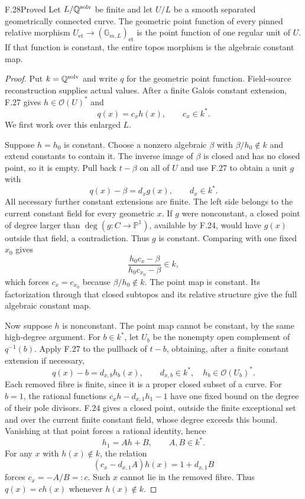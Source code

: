 \begin{claim}{F.28}{Proved}
Let $L/\mathbb Q^{\mathrm{solv}}$ be finite and let $U/L$ be a smooth
separated geometrically connected curve. The geometric point
function of every pinned relative morphism
$U_{\mathrm{et}}\to(\mathbb G_{m,L})_{\mathrm{et}}$ is the
point function of one regular unit of $U$. If that function is
constant, the entire topos morphism is the algebraic constant
map.
\end{claim}
\begin{proof}
Put $k=\mathbb Q^{\mathrm{solv}}$ and write $q$ for the geometric
point function. Field-source reconstruction supplies actual
values. After a finite Galois constant extension, F.27 gives
$h\in\mathcal O(U)^*$ and
\[
 q(x)=c_x h(x),\qquad c_x\in k^*.
\]
We first work over this enlarged $L$.

Suppose $h=h_0$ is constant. Choose a nonzero algebraic $\beta$
with $\beta/h_0\notin k$ and extend constants to contain it.
The inverse image of $\beta$ is closed and has no closed point,
so it is empty. Pull back $t-\beta$ on all of $U$ and use
F.27 to obtain a unit $g$ with
\[
 q(x)-\beta=d_xg(x),\qquad d_x\in k^*.
\]
All necessary further constant extensions are finite. The left
side belongs to the current constant field for every geometric
$x$. If $g$ were nonconstant, a closed point of degree larger
than $\deg(g:C\to\mathbb P^1)$, available by F.24, would
have $g(x)$ outside that field, a contradiction. Thus $g$ is
constant. Comparing with one fixed $x_0$ gives
\[
 \frac{h_0c_x-\beta}{h_0c_{x_0}-\beta}\in k,
\]
which forces $c_x=c_{x_0}$ because $\beta/h_0\notin k$.
The point map is constant. Its factorization through that closed
subtopos and its relative structure give the full algebraic
constant map.

Now suppose $h$ is nonconstant. The point map cannot be
constant, by the same high-degree argument. For $b\in k^*$,
let $U_b$ be the nonempty open complement of $q^{-1}(b)$.
Apply F.27 to the pullback of $t-b$, obtaining, after a finite
constant extension if necessary,
\[
 q(x)-b=d_{x,b}h_b(x),\qquad
 d_{x,b}\in k^*,\quad h_b\in\mathcal O(U_b)^*.
\]
Each removed fibre is finite, since it is a proper closed
subset of a curve. For $b=1$, the rational functions
$c_xh-d_{x,1}h_1-1$ have one fixed bound on the degree of their
pole divisors. F.24 gives a closed point, outside the finite
exceptional set and over the current finite constant field,
whose degree exceeds this bound. Vanishing at that point forces
a rational identity, hence
\[
 h_1=Ah+B,\qquad A,B\in k^*.
\]
For any $x$ with $h(x)\notin k$, the relation
\[
 (c_x-d_{x,1}A)h(x)=1+d_{x,1}B
\]
forces $c_x=-A/B=:c$. Such $x$ cannot lie in the removed
fibre. Thus $q(x)=ch(x)$ whenever $h(x)\notin k$.


\end{proof}

